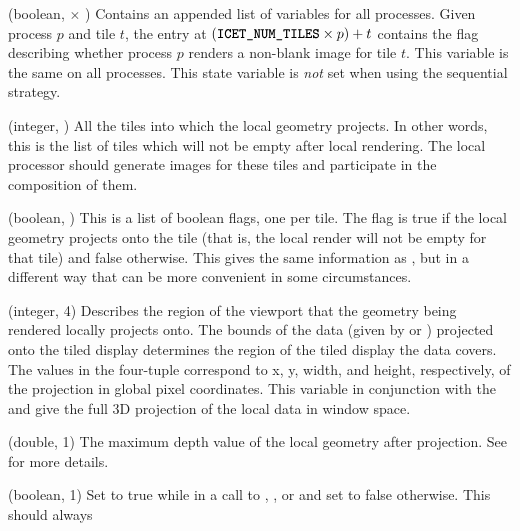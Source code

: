 \begin{Description}[xxxxxxxx]
\item[\CEnum{ICET\_ALL\_CONTAINED\_TILES\_MASKS}] (boolean,
   $\times$ ) Contains
  an appended list of  variables for
  all processes.  Given process $p$ and tile $t$, the entry at
  $(\CEnum{ICET\_NUM\_TILES} \times p)+t$ contains the flag describing
  whether process $p$ renders a non-blank image for tile $t$.  This
  variable is the same on all processes.  This state variable is \emph{not}
  set when using the sequential strategy.
\item[\CEnum{ICET\_CONTAINED\_TILES\_LIST}] (integer,
  ) All the tiles into which the local
  geometry projects.  In other words, this is the list of tiles which will
  not be empty after local rendering.  The local processor should generate
  images for these tiles and participate in the composition of them.
\item[\CEnum{ICET\_CONTAINED\_TILES\_MASK}] (boolean,
  ) This is a list of boolean flags, one per tile.
  The flag is true if the local geometry projects onto the tile (that is,
  the local render will not be empty for that tile) and false otherwise.
  This gives the same information as ,
  but in a different way that can be more convenient in some circumstances.
\item[\CEnum{ICET\_CONTAINED\_VIEWPORT}] (integer, 4) Describes the region
  of the viewport that the geometry being rendered locally projects onto.
  The bounds of the data (given by  or
  ) projected onto the tiled display determines
  the region of the tiled display the data covers.  The values in the
  four-tuple correspond to x, y, width, and height, respectively, of the
  projection in global pixel coordinates.  This variable in conjunction
  with the  and  give the
  full 3D projection of the local data in window space.
\item[\CEnum{ICET\_FAR\_DEPTH}] (double, 1) The maximum depth value of the
  local geometry after projection.  See 
  for more details.
\item[\CEnum{ICET\_IS\_DRAWING\_FRAME}] (boolean, 1) Set to true while in a
  call to , , or
   and set to false otherwise.  This should always

\end{Description}
